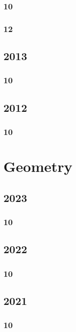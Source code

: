 \documentclass[11pt]{book}
\begin{document}
\subsection{10}

\subsection{12}

\section{2013}
\subsection{10}

\section{2012}
\subsection{10}





\chapter{Geometry}
\section{2023}
\subsection{10}


\section{2022}
\subsection{10}


\section{2021}
\subsection{10}

\end{document}
